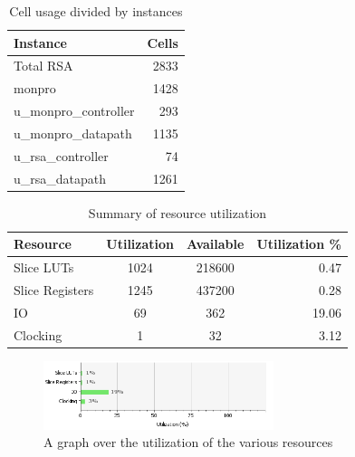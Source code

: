 %
\begin{table}[htp]
    \begin{center}
        \begin{tabular}{l | r}
            Instance                     & Cells \\
            \hline
            Total RSA                    & 2833 \\
            \quad monpro                 & 1428 \\
            \qquad u\_monpro\_controller & 293  \\
            \qquad u\_monpro\_datapath   & 1135 \\
            \quad u\_rsa\_controller     & 74   \\
            \quad u\_rsa\_datapath       & 1261 \\
        \end{tabular}
        \caption{Cell usage divided by instances}
        \label{tab:cell_usage}
    \end{center}
\end{table}
%
\begin{table}[htp]
    \begin{center}  
        \begin{tabular}{ l | c | c | r}
             Resource & Utilization & Available & Utilization \%  \\
             \hline
             Slice LUTs & 1024 & 218600 & 0.47 \\
             Slice Registers & 1245 & 437200 & 0.28 \\
             IO & 69 & 362 & 19.06 \\
             Clocking & 1 & 32 & 3.12 \\
        \end{tabular}
        \caption{Summary of resource utilization }
        \label{tab:resource_utilization}
    \end{center}
\end{table}
%
\begin{figure}[htp]
    \centering
    \includegraphics[width=0.6\textwidth]{images/utilization}
    \caption{A graph over the utilization of the various resources}
    \label{fig:utilization}
\end{figure}

